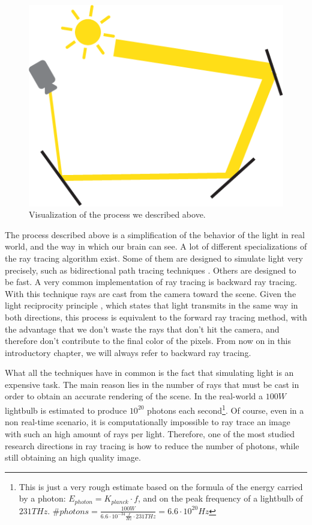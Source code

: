 \documentclass{PoliMi_MasterThesis}
\begin{document}
\begin{figure}[H]
    \centering
    \includegraphics[width=\textwidth*\real{0.4}]{Images/ray_tracing_simple.png}
    \caption{Visualization of the process we described above.}
    \label{fig:ray_tracing_intro}
\end{figure}

The process described above is a simplification of the behavior of the light in real world, and the way in which our brain can see. A lot of different specializations of the ray tracing algorithm exist. Some of them are designed to simulate light very precisely, such as bidirectional path tracing techniques \cite{bidirectional_path_tracing}. Others are designed to be fast. A very common implementation of ray tracing is backward ray tracing. With this technique rays are cast from the camera toward the scene. Given the light reciprocity principle \cite{light_reciprocity}, which states that light transmits in the same way in both directions, this process is equivalent to the forward ray tracing method, with the advantage that we don't waste the rays that don't hit the camera, and therefore don't contribute to the final color of the pixels. From now on in this introductory chapter, we will always refer to backward ray tracing.

What all the techniques have in common is the fact that simulating light is an expensive task. The main reason lies in the number of rays that must be cast in order to obtain an accurate rendering of the scene. In the real-world a $100W$ lightbulb is estimated to produce $10^{20}$ photons each second\footnote{This is just a very rough estimate based on the formula of the energy carried by a photon: $E_{photon}=K_{planck}\cdot f$, and on the peak frequency of a lightbulb of $231THz$. $\# photons = \frac{100W}{6.6\cdot 10^{-34}\frac{J}{Hz} \cdot 231THz} = 6.6\cdot 10^{20}Hz$}. Of course, even in a non real-time scenario, it is computationally impossible to ray trace an image with such an high amount of rays per light. Therefore, one of the most studied research directions in ray tracing is how to reduce the number of photons, while still obtaining an high quality image.
\end{document}

